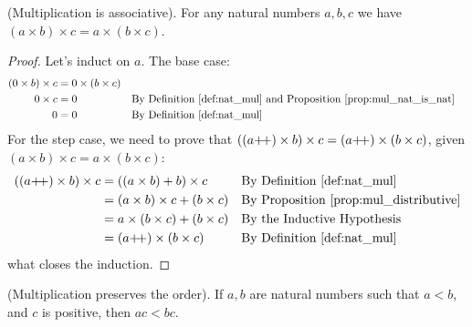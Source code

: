 \begin{proposition}
    \textup{(Multiplication is associative).} For any natural numbers $a,b,c$ we have $(a \times b) \times c = a \times (b\times c)$.
    \end{proposition}
\begin{proof}
    Let's induct on $a$. The base case:
    \begin{align*}
        (0\times b) \times c &= 0 \times (b \times c) \\
        0 \times c &= 0 && \text{By Definition~\ref{def:nat_mul} and Proposition~\ref{prop:mul_nat_is_nat}}\\
        0 &= 0 && \text{By Definition~\ref{def:nat_mul}}
    \end{align*}
    For the step case, we need to prove that $((a\operatorname{\!+\!+})\times b) \times c = (a\operatorname{\!+\!+}) \times (b\times c)$, given $(a\times b)\times c = a \times (b\times c)$:
    \begin{align*}
        ((a\operatorname{\!+\!+})\times b) \times c &= ((a \times b) + b) \times c && \text{By Definition~\ref{def:nat_mul}}\\
        &= (a \times b) \times c + (b \times c) && \text{By Proposition~\ref{prop:mul_distributive}}\\ 
        &= a\times (b \times c) + (b \times c) && \text{By the Inductive Hypothesis}\\
        &= (a\operatorname{\!+\!+})\times(b\times c) && \text{By Definition~\ref{def:nat_mul}}
    \end{align*}
    what closes the induction.
\end{proof}
\begin{proposition}
    \textup{(Multiplication preserves the order).} If $a, b$ are natural numbers such that $a < b$, and $c$ is positive, then $ac<bc$\label{prop:nat_mul_preserve_order}.
\end{proposition}
